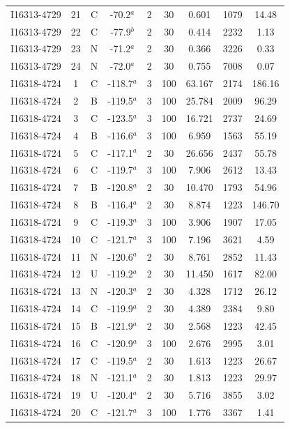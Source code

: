 \begin{table}
\begin{tabular}{ccccccccc}
I16313-4729 & 21 & C & -70.2$^{a}$ & 2 & 30 & 0.601 & 1079 & 14.48 \\
I16313-4729 & 22 & C & -77.9$^{b}$ & 2 & 30 & 0.414 & 2232 & 1.13 \\
I16313-4729 & 23 & N & -71.2$^{a}$ & 2 & 30 & 0.366 & 3226 & 0.33 \\
I16313-4729 & 24 & N & -72.0$^{a}$ & 2 & 30 & 0.755 & 7008 & 0.07 \\
I16318-4724 & 1 & C & -118.7$^{a}$ & 3 & 100 & 63.167 & 2174 & 186.16 \\
I16318-4724 & 2 & B & -119.5$^{a}$ & 3 & 100 & 25.784 & 2009 & 96.29 \\
I16318-4724 & 3 & C & -123.5$^{a}$ & 3 & 100 & 16.721 & 2737 & 24.69 \\
I16318-4724 & 4 & B & -116.6$^{a}$ & 3 & 100 & 6.959 & 1563 & 55.19 \\
I16318-4724 & 5 & C & -117.1$^{a}$ & 2 & 30 & 26.656 & 2437 & 55.78 \\
I16318-4724 & 6 & C & -119.7$^{a}$ & 3 & 100 & 7.906 & 2612 & 13.43 \\
I16318-4724 & 7 & B & -120.8$^{a}$ & 2 & 30 & 10.470 & 1793 & 54.96 \\
I16318-4724 & 8 & B & -116.4$^{a}$ & 2 & 30 & 8.874 & 1223 & 146.70 \\
I16318-4724 & 9 & C & -119.3$^{a}$ & 3 & 100 & 3.906 & 1907 & 17.05 \\
I16318-4724 & 10 & C & -121.7$^{a}$ & 3 & 100 & 7.196 & 3621 & 4.59 \\
I16318-4724 & 11 & N & -120.6$^{a}$ & 2 & 30 & 8.761 & 2852 & 11.43 \\
I16318-4724 & 12 & U & -119.2$^{a}$ & 2 & 30 & 11.450 & 1617 & 82.00 \\
I16318-4724 & 13 & N & -120.3$^{a}$ & 2 & 30 & 4.328 & 1712 & 26.12 \\
I16318-4724 & 14 & C & -119.9$^{a}$ & 2 & 30 & 4.389 & 2384 & 9.80 \\
I16318-4724 & 15 & B & -121.9$^{a}$ & 2 & 30 & 2.568 & 1223 & 42.45 \\
I16318-4724 & 16 & C & -120.9$^{a}$ & 3 & 100 & 2.676 & 2995 & 3.01 \\
I16318-4724 & 17 & C & -119.5$^{a}$ & 2 & 30 & 1.613 & 1223 & 26.67 \\
I16318-4724 & 18 & N & -121.1$^{a}$ & 2 & 30 & 1.813 & 1223 & 29.97 \\
I16318-4724 & 19 & U & -120.4$^{a}$ & 2 & 30 & 5.716 & 3855 & 3.02 \\
I16318-4724 & 20 & C & -121.7$^{a}$ & 3 & 100 & 1.776 & 3367 & 1.41 \\

\end{tabular}
\end{table}
